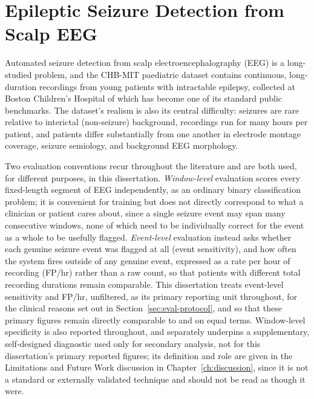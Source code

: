 
\section{Epileptic Seizure Detection from Scalp EEG}

Automated seizure detection from scalp electroencephalography (EEG) is a long-studied problem, and the CHB-MIT paediatric dataset \citep{goldberger2000} contains continuous, long-duration recordings from young patients with intractable epilepsy, collected at Boston Children's Hospital of which has become one of its standard public benchmarks. The dataset's realism is also its central difficulty: seizures are rare relative to interictal (non-seizure) background, recordings run for many hours per patient, and patients differ substantially from one another in electrode montage coverage, seizure semiology, and background EEG morphology.

Two evaluation conventions recur throughout the literature and are both used, for different purposes, in this dissertation. \emph{Window-level} evaluation scores every fixed-length segment of EEG independently, as an ordinary binary classification problem; it is convenient for training but does not directly correspond to what a clinician or patient cares about, since a single seizure event may span many consecutive windows, none of which need to be individually correct for the event as a whole to be usefully flagged. \emph{Event-level} evaluation instead asks whether each genuine seizure event was flagged at all (event sensitivity), and how often the system fires outside of any genuine event, expressed as a rate per hour of recording (FP/hr) rather than a raw count, so that patients with different total recording durations remain comparable. 
This dissertation treats event-level sensitivity and FP/hr, unfiltered, as its primary reporting unit throughout, for the clinical reasons set out in Section~\ref{sec:eval-protocol}, and so that these primary figures remain directly comparable to \citet{ali2024} and \citet{shoeb2009} on equal terms. Window-level specificity is also reported throughout, and separately underpins a supplementary, self-designed diagnostic used only for secondary analysis, not for this dissertation's primary reported figures; its definition and role are given in the Limitations and Future Work discussion in Chapter~\ref{ch:discussion}, since it is not a standard or externally validated technique and should not be read as though it were.
